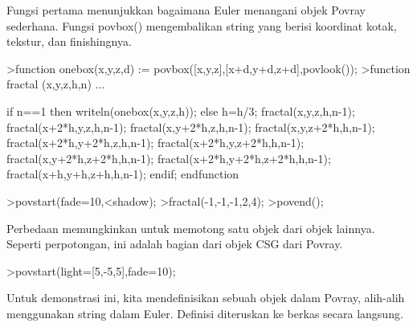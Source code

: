 \documentclass[a4paper,10pt]{article}
\begin{document}
\begin{eulernotebook}
\begin{eulercomment}
\begin{eulercomment}
\begin{eulercomment}
Fungsi pertama menunjukkan bagaimana Euler menangani objek Povray
sederhana. Fungsi povbox() mengembalikan string yang berisi koordinat
kotak, tekstur, dan finishingnya.
\end{eulercomment}
\begin{eulerprompt}
>function onebox(x,y,z,d) := povbox([x,y,z],[x+d,y+d,z+d],povlook());
>function fractal (x,y,z,h,n) ...
\end{eulerprompt}
\begin{eulerudf}
   if n==1 then writeln(onebox(x,y,z,h));
   else
     h=h/3;
     fractal(x,y,z,h,n-1);
     fractal(x+2*h,y,z,h,n-1);
     fractal(x,y+2*h,z,h,n-1);
     fractal(x,y,z+2*h,h,n-1);
     fractal(x+2*h,y+2*h,z,h,n-1);
     fractal(x+2*h,y,z+2*h,h,n-1);
     fractal(x,y+2*h,z+2*h,h,n-1);
     fractal(x+2*h,y+2*h,z+2*h,h,n-1);
     fractal(x+h,y+h,z+h,h,n-1);
   endif;
  endfunction
\end{eulerudf}
\begin{eulerprompt}
>povstart(fade=10,<shadow);
>fractal(-1,-1,-1,2,4);
>povend();
\end{eulerprompt}
\begin{eulercomment}
Perbedaan memungkinkan untuk memotong satu objek dari objek lainnya.
Seperti perpotongan, ini adalah bagian dari objek CSG dari Povray.
\end{eulercomment}
\begin{eulerprompt}
>povstart(light=[5,-5,5],fade=10);
\end{eulerprompt}
\begin{eulercomment}
Untuk demonstrasi ini, kita mendefinisikan sebuah objek dalam Povray,
alih-alih menggunakan string dalam Euler. Definisi diteruskan ke
berkas secara langsung.


\end{eulercomment}
\end{eulercomment}
\end{eulercomment}
\end{eulernotebook}
\end{document}
